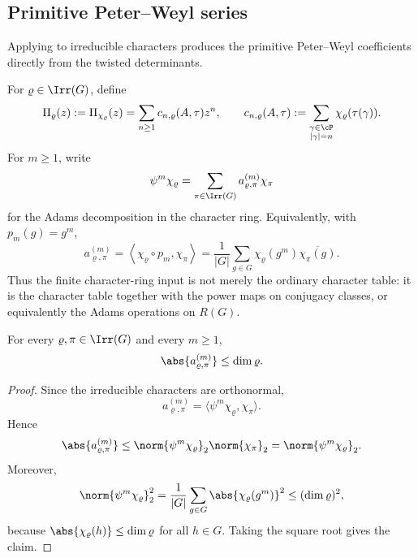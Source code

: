 \subsection{Primitive Peter--Weyl series}

Applying  to irreducible
characters produces the primitive Peter--Weyl coefficients directly
from the twisted determinants.

For \(\varrho\in\Irr(G)\), define
\begin{equation}\label{eq:primitive-peter-weyl-series}
  \Pi_\varrho(z):=\Pi_{\chi_\varrho}(z)
  =\sum_{n\ge 1}c_{n,\varrho}(A,\tau)z^n,
  \qquad
  c_{n,\varrho}(A,\tau)
  :=\sum_{\substack{\gamma\in\cP\\ |\gamma|=n}}
    \chi_\varrho(\tau(\gamma)).
\end{equation}
For \(m\ge 1\), write
\begin{equation}\label{eq:adams-character-decomposition}
  \psi^m\chi_\varrho
  =\sum_{\pi\in\Irr(G)}a_{\varrho,\pi}^{(m)}\chi_\pi
\end{equation}
for the Adams decomposition in the character ring. Equivalently, with
\(p_m(g)=g^m\),
\begin{equation}\label{eq:adams-coefficient-inner-product}
  a_{\varrho,\pi}^{(m)}
  =
  \left\langle \chi_\varrho\circ p_m,\chi_\pi\right\rangle
  =
  \frac{1}{|G|}\sum_{g\in G}
    \chi_\varrho(g^m)\overline{\chi_\pi(g)}.
\end{equation}
Thus the finite character-ring input is not merely the ordinary
character table: it is the character table together with the power maps
on conjugacy classes, or equivalently the Adams operations on \(R(G)\).

\begin{lemma}
  \label{lem:adams-coefficients-bounded}
  For every \(\varrho,\pi\in\Irr(G)\) and every \(m\ge 1\),
  \[
    \abs{a_{\varrho,\pi}^{(m)}}\le \dim\varrho.
  \]
\end{lemma}

\begin{proof}
  Since the irreducible characters are orthonormal,
  \[
    a_{\varrho,\pi}^{(m)}
    =\langle \psi^m\chi_\varrho,\chi_\pi\rangle.
  \]
  Hence
  \[
    \abs{a_{\varrho,\pi}^{(m)}}
    \le \norm{\psi^m\chi_\varrho}_2\norm{\chi_\pi}_2
    =\norm{\psi^m\chi_\varrho}_2.
  \]
  Moreover,
  \[
    \norm{\psi^m\chi_\varrho}_2^2
    =\frac{1}{|G|}\sum_{g\in G}\abs{\chi_\varrho(g^m)}^2
    \le (\dim\varrho)^2,
  \]
  because \(\abs{\chi_\varrho(h)}\le \dim\varrho\) for all \(h\in G\).
  Taking the square root gives the claim.
\end{proof}

